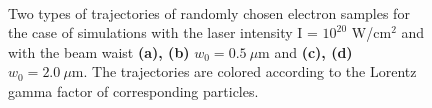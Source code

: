 \begin{figure}[h!]
	\centering
	\\[2mm]
	\caption{Two types of trajectories of randomly chosen electron samples for the case of simulations with the laser intensity I = $ 10^{20} $ W/cm$^2$ and with the beam waist \textbf{(a), (b)} $ w_0 = 0.5 \ \mu\mathrm{m} $ and \textbf{(c), (d)} $ w_0 = 2.0 \ \mu\mathrm{m} $. The trajectories are colored according to the Lorentz gamma factor of corresponding particles.}
	\label{fig:19}
\end{figure}

